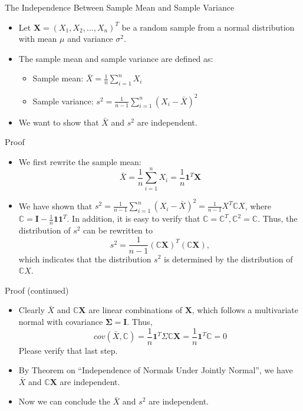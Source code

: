 \documentclass[
  ignorenonframetext,
]{beamer}
\begin{document}
\begin{frame}{The Independence Between Sample Mean and Sample Variance}
\protect\hypertarget{the-independence-between-sample-mean-and-sample-variance}{}
\begin{itemize}
\item
  Let \(\mathbf X =(X_1, X_2, ..., X_n)^T\) be a random sample from a
  normal distribution with mean \(\mu\) and variance \(\sigma^2\).
\item
  The sample mean and sample variance are defined as:

  \begin{itemize}
  \item
    Sample mean: \(\bar{X} = \frac{1}{n} \sum_{i=1}^{n} X_i\)
  \item
    Sample variance:
    \(s^2 = \frac{1}{n-1} \sum_{i=1}^{n} (X_i - \bar{X})^2\)
  \end{itemize}
\item
  We want to show that \(\bar{X}\) and \(s^2\) are independent.
\end{itemize}
\end{frame}

\begin{frame}{Proof}
\protect\hypertarget{proof}{}
\begin{itemize}
\item
  We first rewrite the sample mean:
  \[\bar{X} = \frac{1}{n} \sum_{i=1}^{n} X_i =\frac{1}{n}\mathbf 1^T \mathbf X \]
\item
  We have shown that
  \(s^2 = \frac{1}{n-1} \sum_{i=1}^{n} (X_i - \bar{X})^2=\frac{1}{n-1}X^T\mathbb CX\),
  where \(\mathbb C=\mathbf I - \frac{1}{n}\mathbf 1 \mathbf 1^T\). In
  addition, it is easy to verify that
  \(\mathbb C=\mathbb C^T, \mathbb C^2=\mathbb C\). Thus, the
  distribution of \(s^2\) can be rewritten to
  \[s^2=\frac{1}{n-1} (\mathbb C\mathbf X)^T (\mathbb C\mathbf X),\]
  which indicates that the distribution \(s^2\) is determined by the
  distribution of \(\mathbb C X\).
\end{itemize}
\end{frame}

\begin{frame}{Proof (continued)}
\protect\hypertarget{proof-continued}{}
\begin{itemize}
\item
  Clearly \(\bar X\) and \(\mathbb C \mathbf X\) are linear combinations
  of \(\mathbf X\), which follows a multivariate normal with covariance
  \(\boldsymbol\Sigma= \mathbf I\). Thus,
  \[cov(\bar X, \mathbb C) = \frac{1}{n}\mathbf 1^T \Sigma \mathbb C \mathbf X= \frac{1}{n}\mathbf 1^T \mathbb C=0\]
  Please verify that last step.
\item
  By Theorem on ``Independence of Normals Under Jointly Normal'', we
  have \(\bar X\) and \(\mathbb C\mathbf X\) are independent.
\item
  Now we can conclude the \(\bar X\) and \(s^2\) are independent.
\end{itemize}
\end{frame}
\end{document}
